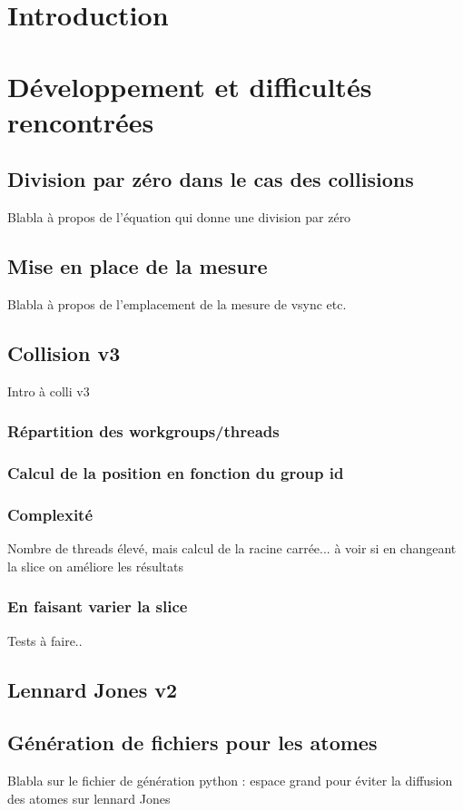 \documentclass{article}
\begin{document}
\section{Introduction}

\section{Développement et difficultés rencontrées}

\subsection{Division par zéro dans le cas des collisions}
Blabla à propos de l'équation qui donne une division par zéro

\subsection{Mise en place de la mesure}
Blabla à propos de l'emplacement de la mesure de vsync etc.

\subsection{Collision v3}
Intro à colli v3
\subsubsection{Répartition des workgroups/threads}
\subsubsection{Calcul de la position en fonction du group id}
\subsubsection{Complexité}
Nombre de threads élevé, mais calcul de la racine carrée... à voir si en
changeant la slice on améliore les résultats
\subsubsection{En faisant varier la slice}
Tests à faire..

\subsection{Lennard Jones v2}

\subsection{Génération de fichiers pour les atomes}
Blabla sur le fichier de génération python : espace grand pour éviter la
diffusion des atomes sur lennard Jones
\end{document}
